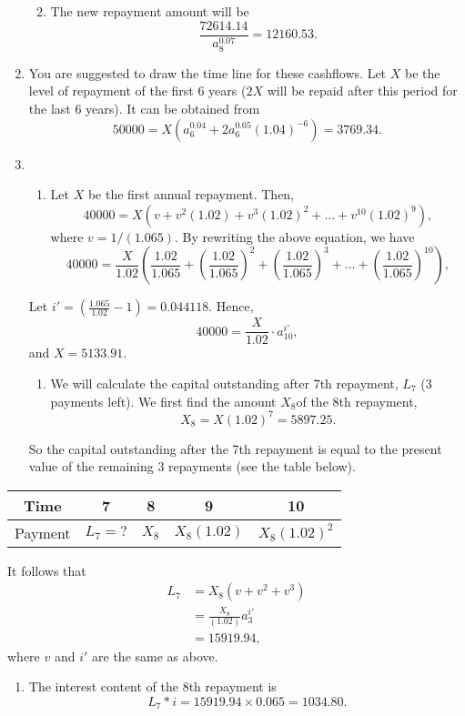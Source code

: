 \documentclass[
]{article}
\providecommand{\tightlist}{%
  \setlength{\itemsep}{0pt}\setlength{\parskip}{0pt}}
\theoremstyle{definition}
\theoremstyle{definition}
\theoremstyle{definition}
\theoremstyle{definition}
\theoremstyle{remark}
\begin{document}
\begin{enumerate}
  \begin{enumerate}
  \def\labelenumii{\arabic{enumii}.}
  \setcounter{enumii}{2}
  \tightlist
  \item
    The new repayment amount will be
    \[\frac{72614.14}{a^{0.07}_{8}} = 12160.53.\]
  \end{enumerate}
\item
  You are suggested to draw the time line for these cashflows. Let \(X\) be the level of repayment of the first 6 years (\(2X\) will be repaid after this period for the last 6 years). It can be obtained from
  \[ 50000 = X(a^{0.04}_6 + 2 a^{0.05}_6 (1.04)^{-6}) = 3769.34.\]
\item
  \begin{enumerate}
  \def\labelenumii{\arabic{enumii}.}
  \tightlist
  \item
    Let \(X\) be the first annual repayment. Then,\\
    \[ 40000 = X(v + v^2(1.02) + v^3(1.02)^2 + \ldots + v^{10}(1.02)^9),\]
    where \(v = 1/(1.065).\) By rewriting the above equation, we have
    \[ 40000 = \frac{X}{1.02}(\frac{1.02}{1.065} + \left( \frac{1.02}{1.065} \right)^2 + \left( \frac{1.02}{1.065} \right)^3 + \ldots + \left( \frac{1.02}{1.065} \right)^{10}),\]
  \end{enumerate}

  Let \(i' = \left( \frac{1.065}{1.02} -1 \right) = 0.044118.\) Hence,
  \[ 40000 = \frac{X}{1.02} \cdot a^{i'}_{10},\]
  and \(X = 5133.91.\)

  \begin{enumerate}
  \def\labelenumii{\arabic{enumii}.}
  \setcounter{enumii}{1}
  \tightlist
  \item
    We will calculate the capital outstanding after 7th repayment, \(L_7\) (3 payments left). We first find the amount \(X_8\)of the 8th repayment,
    \[X_8 = X(1.02)^7 = 5897.25.\]
  \end{enumerate}

  So the capital outstanding after the 7th repayment is equal to the present value of the remaining 3 repayments (see the table below).
\end{enumerate}

\begin{longtable}[]{@{}ccccc@{}}
\toprule
Time & 7 & 8 & 9 & 10 \\
\midrule
\endhead
Payment & \(L_7 = ?\) & \(X_8\) & \(X_8 (1.02)\) & \(X_8(1.02)^2\) \\
\bottomrule
\end{longtable}

It follows that
\[
\begin{aligned} L_7 &= X_8( v + v^2 + v^3) \\
&= \frac{X_8}{(1.02)} a^{i'}_3 \\
&= 15919.94,
\end{aligned}\]
where \(v\) and \(i'\) are the same as above.

\begin{enumerate}
\def\labelenumi{\arabic{enumi}.}
\setcounter{enumi}{2}
\tightlist
\item
  The interest content of the 8th repayment is
  \[ L_7 * i = 15919.94 \times 0.065 = 1034.80.\]
\end{enumerate}
\end{document}
